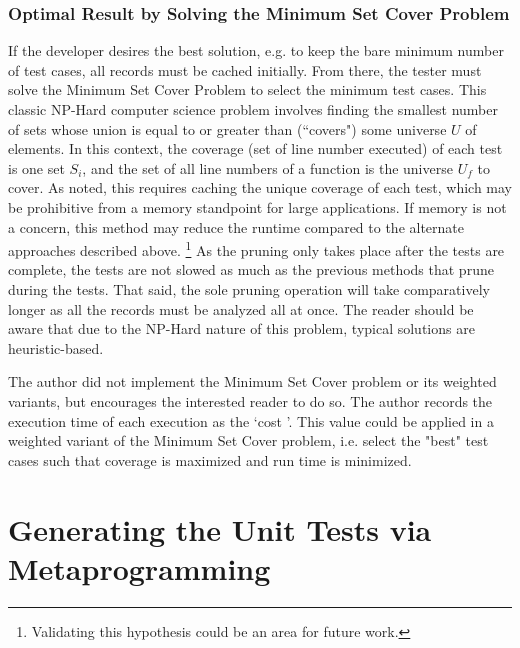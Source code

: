 \subsubsection{Optimal Result by Solving the Minimum Set Cover Problem}\label{sec:tuning-2}
If the developer desires the best solution, e.g. to keep the bare minimum
number of test cases, all records must be cached initially.  
From there, the tester must solve the Minimum Set Cover Problem
\cite{hassin2005better} to select the minimum test cases.
This classic NP-Hard computer science problem involves finding the smallest number
of sets whose union is equal to or greater than (“covers") some universe $U$ of elements.  
In this context, the coverage (set of line number executed) of each test is one set $S_i$,
and the set of all line numbers of a function is the universe $U_f$ to cover.  
As noted, this requires caching the unique coverage of each test, which may 
be prohibitive from a memory standpoint for large applications.
If memory is not a concern, this method may reduce the runtime 
compared to the alternate approaches described above. \footnote{Validating this hypothesis
could be an area for future work.} As the pruning 
only takes place after the tests are complete, the tests are not slowed as much
as the previous methods that prune during the tests.  That said, the sole
pruning operation will take comparatively longer as all the records must be 
analyzed all at once. The reader should be aware that due to the NP-Hard
nature of this problem, typical solutions are heuristic-based.
   
The author did not implement 
the Minimum Set Cover problem or its weighted variants, but encourages 
the interested reader to do so.  The author records the execution time of each 
execution as the \lq cost \rq. This value could be applied in a weighted 
variant of the Minimum Set Cover problem, i.e. select the "best" test cases
such that coverage is maximized and run time is minimized.

\section{Generating the Unit Tests via Metaprogramming}\label{sec:generating-tests}

